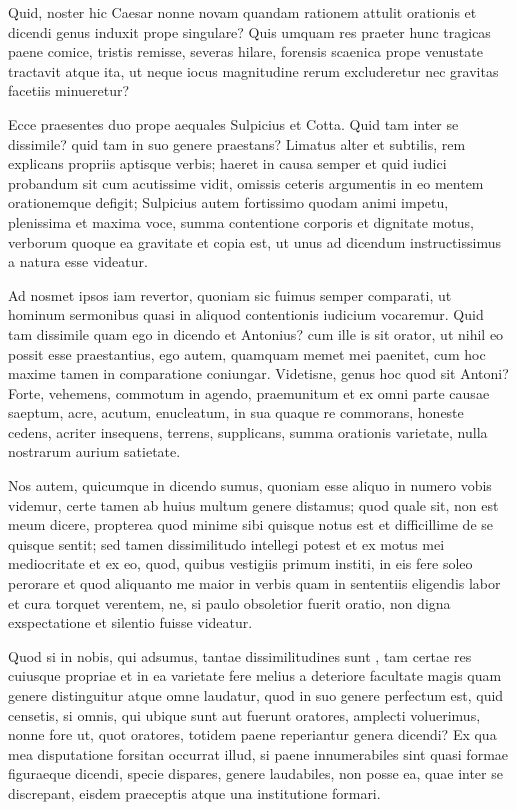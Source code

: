  Quid, noster hic Caesar nonne novam quandam rationem attulit orationis et dicendi genus induxit prope singulare? Quis umquam res praeter hunc tragicas paene comice, tristis remisse, severas hilare, forensis scaenica prope venustate tractavit atque ita, ut neque iocus magnitudine rerum excluderetur nec gravitas facetiis minueretur?

 Ecce praesentes duo prope aequales Sulpicius et Cotta. Quid tam inter se dissimile? quid tam in suo genere praestans? Limatus alter et subtilis, rem explicans propriis aptisque verbis; haeret in causa semper et quid iudici probandum sit cum acutissime vidit, omissis ceteris argumentis in eo mentem orationemque defigit; Sulpicius autem fortissimo quodam animi impetu, plenissima et maxima voce, summa contentione corporis et dignitate motus, verborum quoque ea gravitate et copia est, ut unus ad dicendum instructissimus a natura esse videatur.

 Ad nosmet ipsos iam revertor, quoniam sic fuimus semper comparati, ut hominum sermonibus quasi in aliquod contentionis iudicium vocaremur. Quid tam dissimile quam ego in dicendo et Antonius? cum ille is sit orator, ut nihil eo possit esse praestantius, ego autem, quamquam memet mei paenitet, cum hoc maxime tamen in comparatione coniungar. Videtisne, genus hoc quod sit Antoni? Forte, vehemens, commotum in agendo, praemunitum et ex omni parte causae saeptum, acre, acutum, enucleatum, in sua quaque re commorans, honeste cedens, acriter insequens, terrens, supplicans, summa orationis varietate, nulla nostrarum aurium satietate.

 Nos autem, quicumque in dicendo sumus, quoniam esse aliquo in numero vobis videmur, certe tamen ab huius multum genere distamus; quod quale sit, non est meum dicere, propterea quod minime sibi quisque notus est et difficillime de se quisque sentit; sed tamen dissimilitudo intellegi potest et ex motus mei mediocritate et ex eo, quod, quibus vestigiis primum institi, in eis fere soleo perorare et quod aliquanto me maior in verbis quam in sententiis eligendis labor et cura torquet verentem, ne, si paulo obsoletior fuerit oratio, non digna exspectatione et silentio fuisse videatur.

 Quod si in nobis, qui adsumus, tantae dissimilitudines sunt , tam certae res cuiusque propriae et in ea varietate fere melius a deteriore facultate magis quam genere distinguitur atque omne laudatur, quod in suo genere perfectum est, quid censetis, si omnis, qui ubique sunt aut fuerunt oratores, amplecti voluerimus, nonne fore ut, quot oratores, totidem paene reperiantur genera dicendi? Ex qua mea disputatione forsitan occurrat illud, si paene innumerabiles sint quasi formae figuraeque dicendi, specie dispares, genere laudabiles, non posse ea, quae inter se discrepant, eisdem praeceptis atque una institutione formari.


